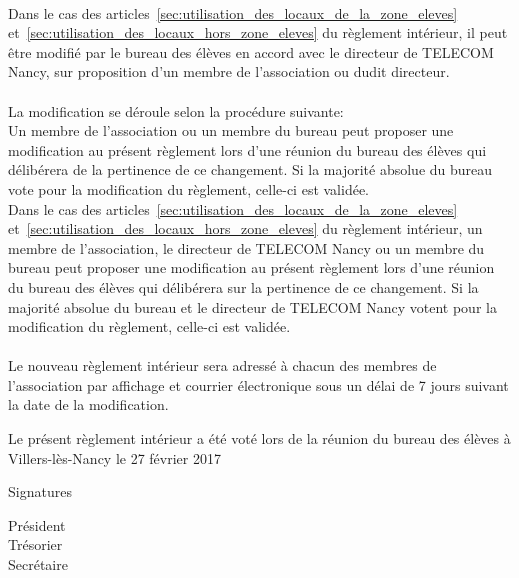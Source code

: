 \documentclass{article} %
\begin{document}
        \paragraph{}
		Dans le cas des
		articles~\ref{sec:utilisation_des_locaux_de_la_zone_eleves}
		et~\ref{sec:utilisation_des_locaux_hors_zone_eleves} du règlement
		intérieur, il peut être modifié par le bureau des élèves en accord avec
		le directeur de TELECOM Nancy, sur proposition d’un membre de
		l’association ou dudit directeur.

        \paragraph{}
		La modification se déroule selon la procédure suivante:\\
		Un membre de l’association ou un membre du bureau peut proposer une
		modification au présent règlement lors d’une réunion du bureau des
		élèves qui délibérera de la pertinence de ce changement. Si la majorité
		absolue du bureau vote pour la modification du règlement, celle-ci est
		validée.\\
		Dans le cas des
		articles~\ref{sec:utilisation_des_locaux_de_la_zone_eleves}
		et~\ref{sec:utilisation_des_locaux_hors_zone_eleves} du règlement
		intérieur, un membre de l’association, le directeur de TELECOM Nancy ou
		un membre du bureau peut proposer une modification au présent règlement
		lors d’une réunion du bureau des élèves qui délibérera sur la pertinence
		de ce changement. Si la majorité absolue du bureau et le directeur de
		TELECOM Nancy votent pour la modification du règlement, celle-ci est
		validée.

        \paragraph{}
		Le nouveau règlement intérieur sera adressé à chacun des membres de
		l'association par affichage et courrier électronique sous un délai de 7
		jours suivant la date de la modification.

    \vfill
	\begin{center}
		{\large\light{} Le présent règlement intérieur a été voté lors de la réunion
		du bureau des élèves à Villers-lès-Nancy le 27 février 2017}
	\end{center}
	\vfill
	Signatures\par
	\begin{multicols}{3}
	    \begin{center}
	        Président \\
	        Trésorier \\
	        Secrétaire
	    \end{center}
	\end{multicols}
	\vspace{3cm}
	\clearpage
\end{document}
